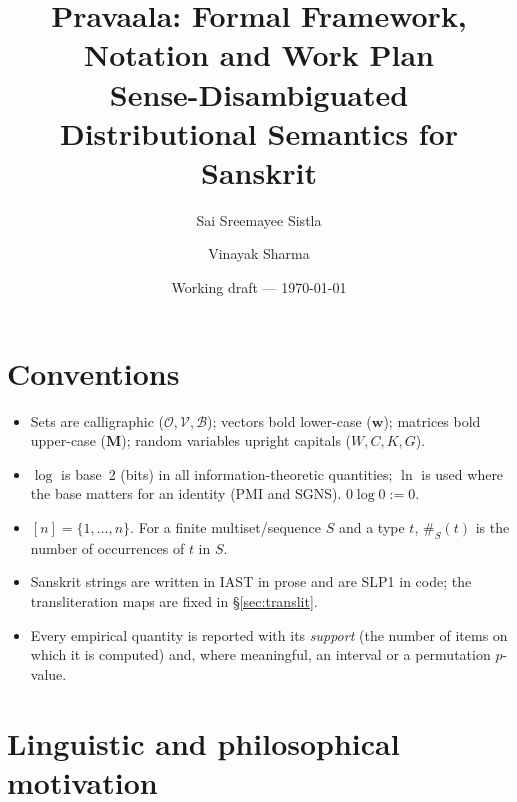\documentclass[11pt,a4paper]{article}
\title{Pravaala: Formal Framework, Notation and Work Plan\\[2pt]
\large Sense-Disambiguated Distributional Semantics for Sanskrit}
\author{Sai Sreemayee Sistla \and Vinayak Sharma}
\date{Working draft --- \today}
\theoremstyle{remark}\newtheorem{remark}{Remark}
\newcommand{\Occ}{\mathcal{O}}          %
\newcommand{\Voc}{\mathcal{V}}          %
\newcommand{\B}{\mathcal{B}}            %
\newcommand{\cnt}{\#}                   %
\renewcommand{\v}[1]{\bm{#1}}           %
\begin{document}
\maketitle
\tableofcontents

\section{Conventions}
\begin{itemize}[nosep]
\item Sets are calligraphic ($\Occ,\Voc,\B$); vectors bold lower-case
  ($\v{w}$); matrices bold upper-case ($\v{M}$); random variables upright
  capitals ($W, C, K, G$).
\item $\log$ is base~2 (bits) in all information-theoretic quantities; $\ln$
  is used where the base matters for an identity (PMI and SGNS).
  $0\log 0 := 0$.
\item $[n] = \{1,\dots,n\}$. For a finite multiset/sequence $S$ and a type $t$,
  $\cnt_S(t)$ is the number of occurrences of $t$ in $S$.
\item Sanskrit strings are written in IAST in prose and are SLP1 in code; the
  transliteration maps are fixed in \S\ref{sec:translit}.
\item Every empirical quantity is reported with its \emph{support} (the number
  of items on which it is computed) and, where meaningful, an interval or a
  permutation $p$-value.
\end{itemize}

\section{Linguistic and philosophical motivation}
\end{document}
